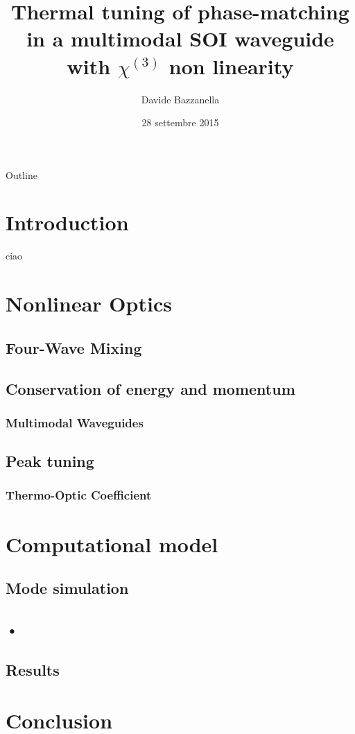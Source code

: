 \documentclass[11pt]{beamer}
\author{Davide Bazzanella}
\title{Thermal tuning of phase-matching in a multimodal SOI waveguide with $\chi^{(3)}$ non linearity}
\date{28 settembre 2015}
\begin{document}
\begin{frame}
\titlepage
\end{frame}

\begin{frame}{Outline}
\footnotesize \tableofcontents
\end{frame}

\section{Introduction}
ciao
\section{Nonlinear Optics}
\subsection{Four-Wave Mixing}
\subsection{Conservation of energy and momentum}
\subsubsection{Multimodal Waveguides}
\subsection{Peak tuning}
\subsubsection{Thermo-Optic Coefficient}
\section{Computational model}
\subsection{Mode simulation}
\subsection{•}
\subsection{Results}
\section{Conclusion}
\end{document}
